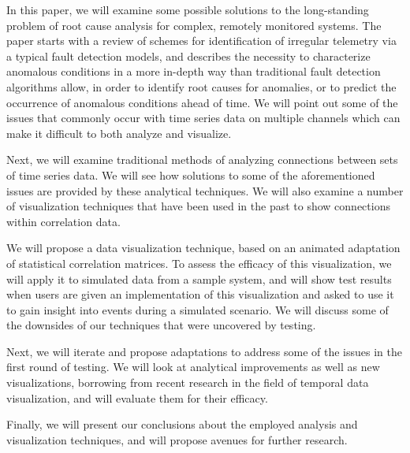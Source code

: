 In this paper, we will examine some possible solutions to the long-standing problem of root cause analysis for complex, remotely monitored systems. The paper starts with a review of schemes for identification of irregular telemetry via a typical fault detection models, and describes the necessity to characterize anomalous conditions in a more in-depth way than traditional fault detection algorithms allow, in order to identify root causes for anomalies, or to predict the occurrence of anomalous conditions ahead of time. We will point out some of the issues that commonly occur with time series data on multiple channels which can make it difficult to both analyze and visualize.

Next, we will examine traditional methods of analyzing connections between sets of time series data. We will see how solutions to some of the aforementioned issues are provided by these analytical techniques. We will also examine a number of visualization techniques that have been used in the past to show connections within correlation data.

We will propose a data visualization technique, based on an animated adaptation of statistical correlation matrices. To assess the efficacy of this visualization, we will apply it to simulated data from a sample system, and will show test results when users are given an implementation of this visualization and asked to use it to gain insight into events during a simulated scenario. We will discuss some of the downsides of our techniques that were uncovered by testing.

Next, we will iterate and propose adaptations to address some of the issues in the first round of testing. We will look at analytical improvements as well as new visualizations, borrowing from recent research in the field of temporal data visualization, and will evaluate them for their efficacy.

Finally, we will present our conclusions about the employed analysis and visualization techniques, and will propose avenues for further research.